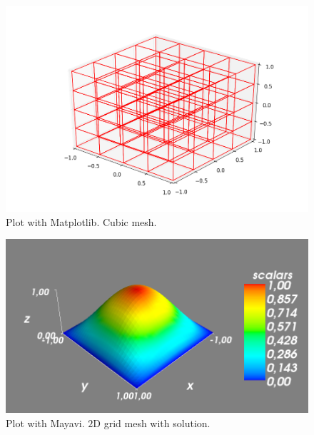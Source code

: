 \begin{figure}[!h]
\label{img:matplotlibMesh}
\centering
\includegraphics[scale=0.4]{images/matplotlibPlotMesh.png}
\caption{Plot with Matplotlib. Cubic mesh.}
\end{figure}

\begin{figure}[!h]
\label{img:mayavi2D}
\centering
\includegraphics[scale=0.35]{images/mayavi2D.png}
\caption{Plot with Mayavi. $2$D grid mesh with solution.}
\end{figure}

